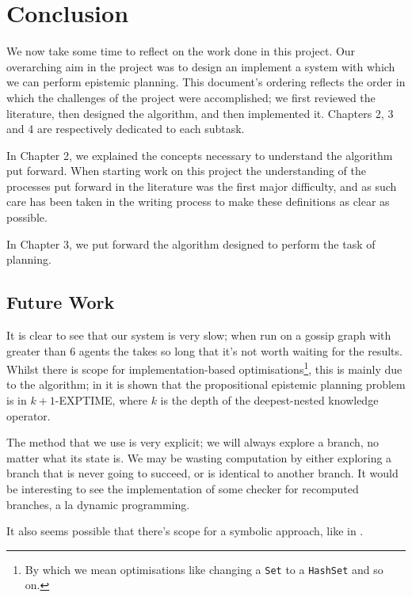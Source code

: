 \documentclass[12pt, a4paper]{article}
\begin{document}
\newpage

\section{Conclusion}

We now take some time to reflect on the work done in this project. Our
overarching aim in the project was to design an implement a system with which we
can perform epistemic planning. This document's ordering reflects the order in
which the challenges of the project were accomplished; we first reviewed the
literature, then designed the algorithm, and then implemented it. Chapters 2, 3
and 4 are respectively dedicated to each subtask.

\bigskip

In Chapter 2, we explained the concepts necessary to understand the algorithm
put forward. When starting work on this project the understanding of the
processes put forward in the literature was the first major difficulty, and as
such care has been taken in the writing process to make these definitions as clear
as possible. 

\bigskip

In Chapter 3, we put forward the algorithm designed to perform the task of
planning.

\subsection{Future Work}

It is clear to see that our system is very slow; when run on a gossip graph with
greater than 6 agents the takes so long that it's not worth waiting for the
results. Whilst there is scope for implementation-based
optimisations\footnote{By which we mean optimisations like changing a
  \texttt{Set} to a \texttt{HashSet} and so on.}, this is mainly due to the
algorithm; in \cite{AutomataTechniques} it is shown that the propositional
epistemic planning problem is in \textsf{$k + 1$-EXPTIME}, where $k$ is the
depth of the deepest-nested knowledge operator. 

The method that we use is very explicit; we will always explore a branch, no
matter what its state is. We may be wasting computation by either exploring a
branch that is never going to succeed, or is identical to another branch. It
would be interesting to see the implementation of some checker for recomputed
branches, a la dynamic programming.

\bigskip

It also seems possible that there's scope for a symbolic approach, like in
\cite{MalvinThesis}.


\newpage

\printbibliography[title={Bibliography}]
\end{document}
